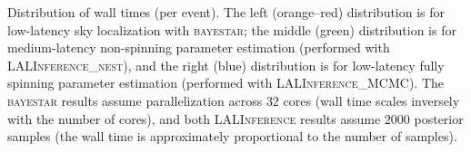 \label{fig:wall-time} Distribution of wall times (per event). The left (orange--red) distribution is for low-latency sky localization with \textsc{bayestar}; the middle (green) distribution is for medium-latency non-spinning parameter estimation (performed with \textsc{LALInference\_nest}), and the right (blue) distribution is for low-latency fully spinning parameter estimation (performed with \textsc{LALInference\_MCMC}). The \textsc{bayestar} results assume parallelization across $32$ cores (wall time scales inversely with the number of cores), and both \textsc{LALInference} results assume $2000$ posterior samples (the wall time is approximately proportional to the number of samples).
  
  